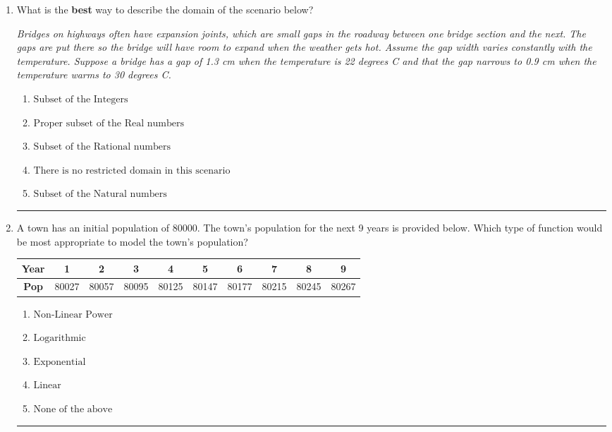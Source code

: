 \documentclass[14pt]{extbook}
\newcommand{\litem}[1]{\item#1\hspace*{-1cm}\rule{\textwidth}{0.4pt}}
\begin{document}
\begin{enumerate}
\litem{
What is the \textbf{best} way to describe the domain of the scenario below?
\begin{center}
    \textit{ Bridges on highways often have expansion joints, which are small gaps in the roadway between one bridge section and the next. The gaps are put there so the bridge will have room to expand when the weather gets hot. Assume the gap width varies constantly with the temperature. Suppose a bridge has a gap of 1.3 cm when the temperature is 22 degrees C and that the gap narrows to 0.9 cm when the temperature warms to 30 degrees C. }
\end{center}
\begin{enumerate}[label=\Alph*.]
\item \( \text{Subset of the Integers} \)
\item \( \text{Proper subset of the Real numbers} \)
\item \( \text{Subset of the Rational numbers} \)
\item \( \text{There is no restricted domain in this scenario} \)
\item \( \text{Subset of the Natural numbers} \)

\end{enumerate} }
\litem{
A town has an initial population of 80000. The town's population for the next 9 years is provided below. Which type of function would be most appropriate to model the town's population?

\begin{tabular}{c|c|c|c|c|c|c|c|c|c}
\textbf{Year} &1 &2 &3 &4 &5 &6 &7 &8 &9\tabularnewline \hline
\textbf{Pop} &80027 &80057 &80095 &80125 &80147 &80177 &80215 &80245 &80267\end{tabular}\begin{enumerate}[label=\Alph*.]
\item \( \text{Non-Linear Power} \)
\item \( \text{Logarithmic} \)
\item \( \text{Exponential} \)
\item \( \text{Linear} \)
\item \( \text{None of the above} \)


\end{enumerate}}
\end{enumerate}
\end{document}
